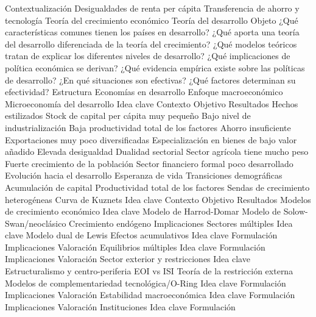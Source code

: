 \documentclass{nuevotema}
\begin{document}
\begin{esquema}[enumerate]
	\1[] 
		\2 Contextualización
			\3 Desigualdades de renta per cápita
			\3 Transferencia de ahorro y tecnología
			\3 Teoría del crecimiento económico
			\3 Teoría del desarrollo
		\2 Objeto
			\3 ¿Qué características comunes tienen los países en desarrollo?
			\3 ¿Qué aporta una teoría del desarrollo diferenciada de la teoría del crecimiento?
			\3 ¿Qué modelos teóricos tratan de explicar los diferentes niveles de desarrollo?
			\3 ¿Qué implicaciones de política económica se derivan?
			\3 ¿Qué evidencia empírica existe sobre las políticas de desarrollo?
			\3 ¿En qué situaciones son efectivas?
			\3 ¿Qué factores determinan su efectividad?
		\2 Estructura
			\3 Economías en desarrollo
			\3 Enfoque macroeconómico
			\3 Microeconomía del desarrollo
	\1 
		\2 Idea clave
			\3 Contexto
			\3 Objetivo
			\3 Resultados
		\2 Hechos estilizados
			\3 Stock de capital per cápita muy pequeño
			\3 Bajo nivel de industrialización
			\3 Baja productividad total de los factores
			\3 Ahorro insuficiente
			\3 Exportaciones muy poco diversificadas
			\3 Especialización en bienes de bajo valor añadido
			\3 Elevada desigualdad
			\3 Dualidad sectorial
			\3 Sector agrícola tiene mucho peso
			\3 Fuerte crecimiento de la población
			\3 Sector financiero formal poco desarrollado
		\2 Evolución hacia el desarrollo
			\3 Esperanza de vida
			\3 Transiciones demográficas
			\3 Acumulación de capital
			\3 Productividad total de los factores
			\3 Sendas de crecimiento heterogéneas
			\3 Curva de Kuznets
	\1 
		\2 Idea clave
			\3 Contexto
			\3 Objetivo
			\3 Resultados
		\2 Modelos de crecimiento económico
			\3 Idea clave
			\3 Modelo de Harrod-Domar
			\3 Modelo de Solow-Swan/neoclásico
			\3 Crecimiento endógeno
			\3 Implicaciones
		\2 Sectores múltiples
			\3 Idea clave
			\3 Modelo dual de Lewis
		\2 Efectos acumulativos
			\3 Idea clave
			\3 Formulación
			\3 Implicaciones
			\3 Valoración
		\2 Equilibrios múltiples
			\3 Idea clave
			\3 Formulación
			\3 Implicaciones
			\3 Valoración
		\2 Sector exterior y restricciones
			\3 Idea clave
			\3 Estructuralismo y centro-periferia
			\3 EOI vs ISI
			\3 Teoría de la restricción externa
		\2 Modelos de complementariedad tecnológica/O-Ring
			\3 Idea clave
			\3 Formulación
			\3 Implicaciones
			\3 Valoración
		\2 Estabilidad macroeconómica
			\3 Idea clave
			\3 Formulación
			\3 Implicaciones
			\3 Valoración
		\2 Instituciones
			\3 Idea clave
			\3 Formulación

\end{esquema}
\end{document}
